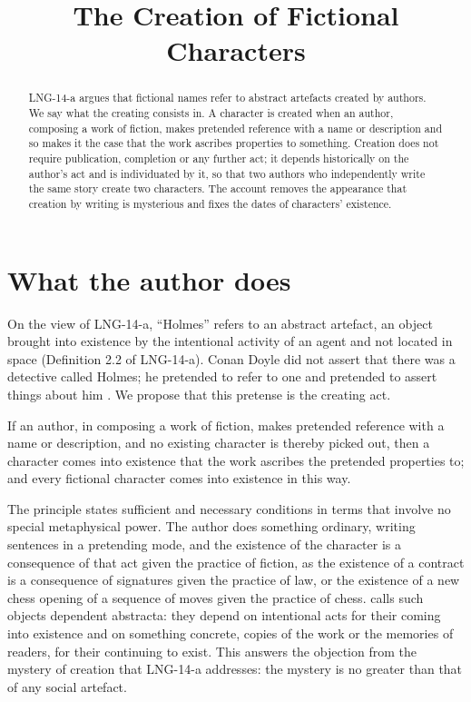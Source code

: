 \documentclass{situationist-preprint}
\title{The Creation of Fictional Characters}
\begin{document}
\maketitle

\begin{abstract}
LNG-14-a argues that fictional names refer to abstract artefacts created by authors. We say what the creating consists in. A character is created when an author, composing a work of fiction, makes pretended reference with a name or description and so makes it the case that the work ascribes properties to something. Creation does not require publication, completion or any further act; it depends historically on the author's act and is individuated by it, so that two authors who independently write the same story create two characters. The account removes the appearance that creation by writing is mysterious and fixes the dates of characters' existence.
\end{abstract}

\section{What the author does}

On the view of LNG-14-a, \enquote{Holmes} refers to an abstract artefact, an object brought into existence by the intentional activity of an agent and not located in space (Definition 2.2 of LNG-14-a). Conan Doyle did not assert that there was a detective called Holmes; he pretended to refer to one and pretended to assert things about him \citep{Searle1975}. We propose that this pretense is the creating act.

\begin{principle}[Creation]\label{p:create}
If an author, in composing a work of fiction, makes pretended reference with a name or description, and no existing character is thereby picked out, then a character comes into existence that the work ascribes the pretended properties to; and every fictional character comes into existence in this way.
\end{principle}

The principle states sufficient and necessary conditions in terms that involve no special metaphysical power. The author does something ordinary, writing sentences in a pretending mode, and the existence of the character is a consequence of that act given the practice of fiction, as the existence of a contract is a consequence of signatures given the practice of law, or the existence of a new chess opening of a sequence of moves given the practice of chess. \citet{Thomasson1999} calls such objects dependent abstracta: they depend on intentional acts for their coming into existence and on something concrete, copies of the work or the memories of readers, for their continuing to exist. This answers the objection from the mystery of creation that LNG-14-a addresses: the mystery is no greater than that of any social artefact.
\end{document}
